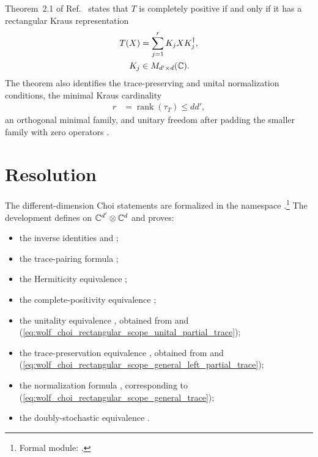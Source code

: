 \documentclass{article}
\begin{document}
Theorem~2.1 of Ref.~\cite{Wolf2012Quantum} states that $T$ is completely
positive if and only if it has a rectangular Kraus representation
\begin{align}
    T(X)
        &=\sum_{j=1}^{r}K_jXK_j^\dagger,
    \label{eq:wolf_choi_rectangular_scope_rectangular_kraus_representation}\\
    K_j
        &\in M_{d'\times d}(\mathbb{C}).
    \label{eq:wolf_choi_rectangular_scope_rectangular_kraus_dimensions}
\end{align}
The theorem also identifies the trace-preserving and unital normalization
conditions, the minimal Kraus cardinality
\begin{align}
    r
        &=\operatorname{rank}(\tau_T)
        \leq dd',
    \label{eq:wolf_choi_rectangular_scope_minimal_kraus_rank}
\end{align}
an orthogonal minimal family, and unitary freedom after padding the smaller
family with zero operators \cite[Theorem~2.1]{Wolf2012Quantum}.

\section{Resolution}

The different-dimension Choi statements are formalized in the namespace
.\footnote{Formal module:
    .}
The development defines  on
$\mathbb{C}^{d'}\otimes\mathbb{C}^d$ and proves:
\begin{itemize}
    \item the inverse identities  and
        ;

    \item the trace-pairing formula ;

    \item the Hermiticity equivalence
        ;

    \item the complete-positivity equivalence
        ;

    \item the unitality equivalence
        , obtained from
         and
        (\ref{eq:wolf_choi_rectangular_scope_unital_partial_trace});

    \item the trace-preservation equivalence
        , obtained from
         and
        (\ref{eq:wolf_choi_rectangular_scope_general_left_partial_trace});

    \item the normalization formula , corresponding
        to (\ref{eq:wolf_choi_rectangular_scope_general_trace});

    \item the doubly-stochastic equivalence
        .
\end{itemize}
\end{document}
